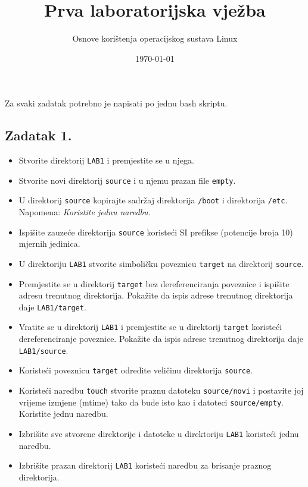 \documentclass{exam}
\title{Prva laboratorijska vježba}
\author{Osnove korištenja operacijskog sustava Linux}
\date{\today}
\newcommand{\shell}[1]{\texttt{#1}}
\begin{document}
\maketitle
Za svaki zadatak potrebno je napisati po jednu bash skriptu.

\subsection*{Zadatak 1.}
\begin{itemize}
    \item Stvorite direktorij \shell{LAB1} i premjestite se u njega.
    \item Stvorite novi direktorij \shell{source} i u njemu prazan file \shell{empty}.
    \item U direktorij \shell{source} kopirajte sadržaj direktorija \shell{/boot} i direktorija \shell{/etc}.\\
    Napomena: \textit{Koristite jednu naredbu.}
    \item Ispišite zauzeće direktorija \shell{source} koristeći SI prefikse (potencije broja 10) mjernih jedinica.
    \item U direktoriju \shell{LAB1} stvorite simboličku poveznicu \shell{target} na direktorij \shell{source}.
    \item Premjestite se u direktorij \shell{target} bez dereferenciranja poveznice i ispišite adresu trenutnog direktorija. Pokažite da ispis adrese trenutnog direktorija daje \shell{LAB1/target}.
    \item Vratite se u direktorij \shell{LAB1} i premjestite se u direktorij \shell{target} koristeći dereferenciranje poveznice. Pokažite da ispis adrese trenutnog direktorija daje \shell{LAB1/source}.
    \item Koristeći poveznicu \shell{target} odredite veličinu direktorija \shell{source}.
    \item Koristeći naredbu \shell{touch} stvorite praznu datoteku \shell{source/novi} i postavite joj vrijeme izmjene (mtime) tako da bude isto kao i datoteci \shell{source/empty}. Koristite jednu naredbu.
    \item Izbrišite sve stvorene direktorije i datoteke u direktoriju \shell{LAB1} koristeći jednu naredbu.
    \item Izbrišite prazan direktorij \shell{LAB1} koristeći naredbu za brisanje praznog direktorija.
  \end{itemize} 
\end{document}

